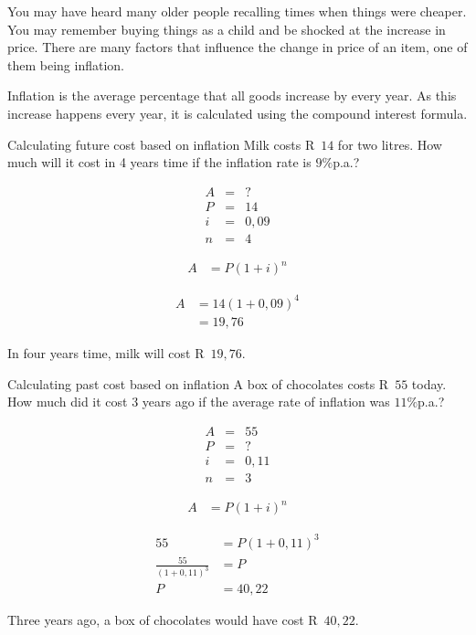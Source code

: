 You may have heard many older people recalling times when things were cheaper. You may remember buying things as a child and be shocked at the increase in price. There are many factors that influence the change in price of an item, one of them being inflation.\par

Inflation is the average percentage that all goods increase by every year. As this increase happens every year, it is calculated using the compound interest formula.


\begin{wex}{Calculating future cost based on inflation}
    {Milk costs R~$14$ for two litres. How much will it cost in 4 years time if the inflation rate is $9\%$p.a.?}{
    
    \begin{eqnarray*}
	A &=& ?\\
	P &=& 14\\
	i &=& 0,09\\
	n &=& 4
    \end{eqnarray*}

    \begin{align*}
	A &= P(1 + i)^n
    \end{align*}

    \begin{align*}
	A &= 14(1 + 0,09)^4\\
	  &= 19,76
    \end{align*}

    In four years time, milk will cost R~$19,76$.
    }
\end{wex}


\begin{wex}{Calculating past cost based on inflation}
    {A box of chocolates costs R~$55$ today. How much did it cost 3 years ago if the average rate of inflation was $11\%$p.a.?}{
    
    \begin{eqnarray*}
	A &=& 55\\
	P &=& ?\\
	i &=& 0,11\\
	n &=& 3
    \end{eqnarray*}

    \begin{align*}
	A &= P(1 + i)^n
    \end{align*}

    \begin{align*}
	55 &= P(1 + 0,11)^3\\
	\frac{55}{(1 + 0,11)^3} &= P\\
	P  &= 40,22
    \end{align*}

    Three years ago, a box of chocolates would have cost R~$40,22$.
    }
\end{wex}


